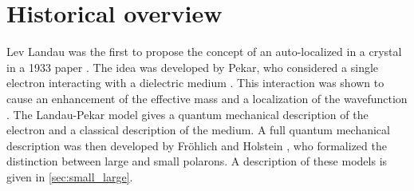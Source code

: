 \section{Historical overview}
Lev Landau was the first to propose the concept of an auto-localized in a crystal in a 1933 paper \cite{terhaar1965}. The idea was developed by Pekar, who considered a single electron interacting with a dielectric medium \cite{pekar1946, pekar1947}. This interaction was shown to cause an enhancement of the effective mass and a localization of the wavefunction \cite{landau1948}. The Landau-Pekar model gives a quantum mechanical description of the electron and a classical description of the medium. A full quantum mechanical description was then developed by Fr\"ohlich \cite{frohlich1950} and Holstein \cite{holstein1959}, who formalized the distinction between large and small polarons. A description of these models is given in \cref{sec:small_large}.